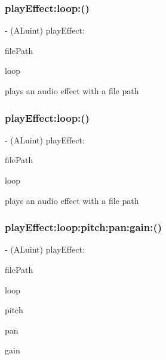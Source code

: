 \subsubsection{\texorpdfstring{play\+Effect\+:loop\+:()}{playEffect:loop:()}\hspace{0.1cm}{\footnotesize\ttfamily [3/4]}}
{\footnotesize\ttfamily -\/ (A\+Luint) play\+Effect\+: \begin{DoxyParamCaption}\item[{(N\+S\+String $\ast$)}]{file\+Path }\item[{loop:(B\+O\+OL)}]{loop }\end{DoxyParamCaption}}

plays an audio effect with a file path \mbox{\label{interfaceSimpleAudioEngine_ac5a5f080f92f05ff681973c3e83c1156}} 
\subsubsection{\texorpdfstring{play\+Effect\+:loop\+:()}{playEffect:loop:()}\hspace{0.1cm}{\footnotesize\ttfamily [4/4]}}
{\footnotesize\ttfamily -\/ (A\+Luint) play\+Effect\+: \begin{DoxyParamCaption}\item[{(N\+S\+String $\ast$)}]{file\+Path }\item[{loop:(B\+O\+OL)}]{loop }\end{DoxyParamCaption}}

plays an audio effect with a file path \mbox{\label{interfaceSimpleAudioEngine_ac3e279ef9259ed8c9cb15dc1341c62e6}} 
\subsubsection{\texorpdfstring{play\+Effect\+:loop\+:pitch\+:pan\+:gain\+:()}{playEffect:loop:pitch:pan:gain:()}\hspace{0.1cm}{\footnotesize\ttfamily [1/4]}}
{\footnotesize\ttfamily -\/ (A\+Luint) play\+Effect\+: \begin{DoxyParamCaption}\item[{(N\+S\+String $\ast$)}]{file\+Path }\item[{loop:(B\+O\+OL)}]{loop }\item[{pitch:(Float32)}]{pitch }\item[{pan:(Float32)}]{pan }\item[{gain:(Float32)}]{gain }\end{DoxyParamCaption}}

